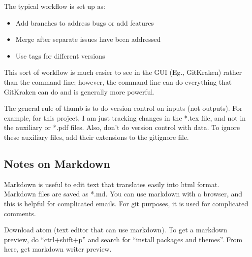 \documentclass[12pt]{article}
\begin{document}
The typical workflow is set up as:
\begin{itemize}
  \item Add branches to address bugs or add features
  \item Merge after separate issues have been addressed
  \item Use tags for different versions
\end{itemize}

This sort of workflow is much easier to see in the GUI (Eg., GitKraken) rather than the command line; however, the command line can do everything that GitKraken can do and is generally more powerful.

The general rule of thumb is to do version control on inputs (not outputs). For example, for this project, I am just tracking changes in the *.tex file, and not in the auxiliary or *.pdf files. Also, don't do version control with data. To ignore these auxiliary files, add their extensions to the gitignore file.

\subsection{Notes on Markdown}
Markdown is useful to edit text that translates easily into html format. Markdown files are saved as *.md. You can use markdown with a browser, and this is helpful for complicated emails. For git purposes, it is used for complicated comments.

Download atom (text editor that can use markdown). To get a markdown preview, do ``ctrl+shift+p'' and search for ``install packages and themes''. From here, get markdown writer preview.
\end{document}
